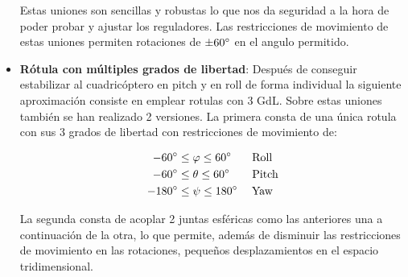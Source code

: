 \begin{itemize}
	Estas uniones son sencillas y robustas lo que nos da seguridad a la hora de poder probar y ajustar los reguladores.
	Las restricciones de movimiento de estas uniones permiten rotaciones de $\pm 60\degree$ en el angulo permitido.
	
	
	\item \textbf{Rótula con múltiples grados de libertad}: Después de conseguir estabilizar al cuadricóptero en pitch y en roll de forma individual la siguiente aproximación consiste en emplear rotulas con 3 GdL. Sobre estas uniones también se han realizado 2 versiones. La primera consta de una única rotula con sus 3 grados de libertad con restricciones de movimiento de:
	
	\begin{align*}
	-60 \degree &\le \varphi \le 60\degree \quad \;\;\;  \text{Roll}\\ 
	-60 \degree&\le \theta \le 60\degree \qquad  \text{Pitch} \\
	-180 \degree&\le \psi \le 180\degree\quad \;  \text{Yaw}
	\end{align*}
	
	
	La segunda consta de acoplar 2 juntas esféricas como las anteriores una a continuación de la otra, lo que permite, además de disminuir las restricciones de movimiento en las rotaciones, pequeños desplazamientos en el espacio tridimensional.
	

\end{itemize}
